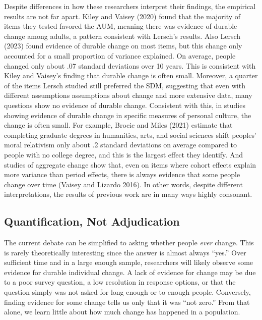\documentclass[
  12pt,
]{article}
\begin{document}
Despite differences in how these researchers interpret their findings,
the empirical results are not far apart. Kiley and Vaisey (2020) found
that the majority of items they tested favored the AUM, meaning there
was evidence of durable change among adults, a pattern consistent with
Lersch's results. Also Lersch (2023) found evidence of durable change on
most items, but this change only accounted for a small proportion of
variance explained. On average, people changed only about .07 standard
deviations over 10 years. This is consistent with Kiley and Vaisey's
finding that durable change is often small. Moreover, a quarter of the
items Lersch studied still preferred the SDM, suggesting that even with
different assumptions assumptions about change and more extensive data,
many questions show no evidence of durable change. Consistent with this,
in studies showing evidence of durable change in specific measures of
personal culture, the change is often small. For example, Brocic and
Miles (2021) estimate that completing graduate degrees in humanities,
arts, and social sciences shift peoples' moral relativism only about .2
standard deviations on average compared to people with no college
degree, and this is the largest effect they identify. And studies of
aggregate change show that, even on items where cohort effects explain
more variance than period effects, there is always evidence that some
people change over time (Vaisey and Lizardo 2016). In other words,
despite different interpretations, the results of previous work are in
many ways highly consonant.

\hypertarget{quantification-not-adjudication}{%
\subsection{Quantification, Not
Adjudication}\label{quantification-not-adjudication}}

The current debate can be simplified to asking whether people
\emph{ever} change. This is rarely theoretically interesting since the
answer is almost always ``yes.'' Over sufficient time and in a large
enough sample, researchers will likely observe some evidence for durable
individual change. A lack of evidence for change may be due to a poor
survey question, a low resolution in response options, or that the
question simply was not asked for long enough or to enough people.
Conversely, finding evidence for some change tells us only that it was
``not zero.'' From that alone, we learn little about how much change has
happened in a population.
\end{document}
